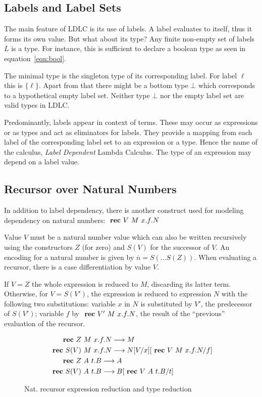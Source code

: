 \subsection{Labels and Label Sets}

The main feature of LDLC is its use of labels. A label evaluates to itself, thus it forms its own value. But what about its type? Any finite non-empty set of labels $L$ is a type. For instance, this is sufficient to declare a boolean type as seen in equation~\ref{eqn:bool}.

The minimal type is the singleton type of its corresponding label. For label $\ell$ this is $\{\ell\}$. Apart from that there might be a bottom type $\bot$ which corresponds to a hypothetical empty label set. Neither type $\bot$ nor the empty label set are valid types in LDLC.

Predominantly, labels appear in context of \case terms. These may occur as expressions or as types and act as eliminators for labels. They provide a mapping from each label of the corresponding label set to an expression or a type. Hence the name of the calculus, \emph{Label Dependent} Lambda Calculus. The type of an expression may depend on a label value.

\subsection{Recursor over Natural Numbers}\label{sec:ldgv-recursor}

In addition to label dependency, there is another construct used for modeling dependency on natural numbers: $\text{ \textbf{rec} } V~M~x.f.N$

Value $V$ must be a natural number value which can also be written recursively using the constructors $Z$ (for zero) and $S(V)$ for the successor of $V$. An encoding for a natural number is given by $\overline{n} = S(\dots S(Z))$. When evaluating a recursor, there is a case differentiation by value $V$.

If $V=Z$ the whole expression is reduced to $M$, discarding its latter term. Otherwise, for $V=S(V')$, the \rec expression is reduced to expression $N$ with the following two substitutions: variable $x$ in $N$ is substituted by $V'$, the predecessor of $S(V')$; variable $f$ by $\text{ \textbf{rec} } V'~M~x.f.N$, the result of the ``previous'' evaluation of the recursor.

\begin{figure}
 \begin{align*}
 \text{ \textbf{rec} } Z~&M~x.f.N \longrightarrow M \\
 \text{ \textbf{rec} } S(V)~&M~x.f.N \longrightarrow N [V/x] [\text{ \textbf{rec} } V~M~x.f.N/f] \\
 \text{ \textbf{rec} } Z~&A~t.B \longrightarrow A \\
 \text{ \textbf{rec} } S(V)~&A~t.B \longrightarrow B [\text{ \textbf{rec} } V~A~t.B/t]
\end{align*}
\caption{Nat. recursor expression reduction and type reduction}
\label{fig:ldlc-rec-exp}
\end{figure}


